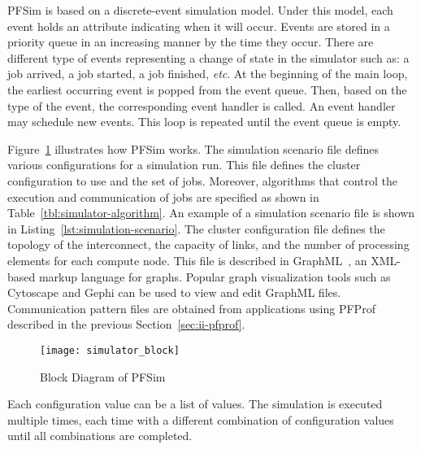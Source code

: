 PFSim is based on a discrete-event simulation model. Under this model,
each event holds an attribute indicating when it will occur. Events are
stored in a priority queue in an increasing manner by the time they
occur. There are different type of events representing a change of state
in the simulator such as: a job arrived, a job started, a job finished,
\emph{etc}. At the beginning of the main loop, the earliest occurring
event is popped from the event queue. Then, based on the type of the
event, the corresponding event handler is called. An event handler may
schedule new events. This loop is repeated until the event queue is
empty.

Figure~\ref{fig:simulator-block} illustrates how PFSim works. The
simulation scenario file defines various configurations for a simulation
run. This file defines the cluster configuration to use and the set of
jobs. Moreover, algorithms that control the execution and communication
of jobs are specified as shown in Table~\ref{tbl:simulator-algorithm}.
An example of a simulation scenario file is shown in
Listing~\ref{lst:simulation-scenario}. The cluster configuration file
defines the topology of the interconnect, the capacity of links, and the
number of processing elements for each compute node. This file is
described in GraphML~\autocite{Brandes2013}, an XML-based markup
language for graphs. Popular graph visualization tools such as Cytoscape
and Gephi can be used to view and edit GraphML files. Communication
pattern files are obtained from applications using PFProf described in
the previous Section~\ref{sec:ii-pfprof}.

\begin{figure}
    \centering
    \texttt{[image: simulator\_block]}
    \caption{Block Diagram of PFSim}%
    \label{fig:simulator-block}
\end{figure}

Each configuration value can be a list of values. The simulation is executed
multiple times, each time with a different combination of configuration values
until all combinations are completed.

